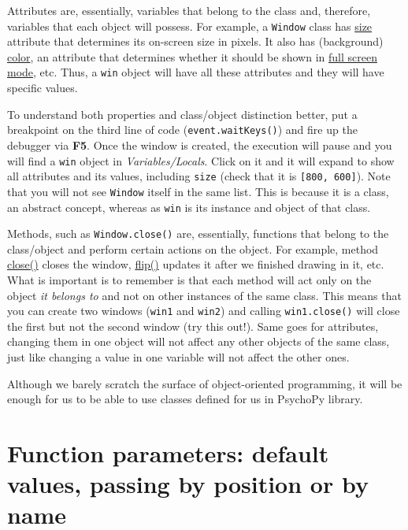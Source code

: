 \documentclass[
]{book}
\begin{document}
Attributes are, essentially, variables that belong to the class and, therefore, variables that each object will possess. For example, a \texttt{Window} class has \href{https://psychopy.org/api/visual/window.html\#psychopy.visual.Window.size}{size} attribute that determines its on-screen size in pixels. It also has (background) \href{https://psychopy.org/api/visual/window.html\#psychopy.visual.Window.color}{color}, an attribute that determines whether it should be shown in \href{https://psychopy.org/api/visual/window.html\#psychopy.visual.Window.fullscr}{full screen mode}, etc. Thus, a \texttt{win} object will have all these attributes and they will have specific values.

To understand both properties and class/object distinction better, put a breakpoint on the third line of code (\texttt{event.waitKeys()}) and fire up the debugger via \textbf{F5}. Once the window is created, the execution will pause and you will find a \texttt{win} object in \emph{Variables/Locals}. Click on it and it will expand to show all attributes and its values, including \texttt{size} (check that it is \texttt{{[}800,\ 600{]}}). Note that you will not see \texttt{Window} itself in the same list. This is because it is a class, an abstract concept, whereas as \texttt{win} is its instance and object of that class.

Methods, such as \texttt{Window.close()} are, essentially, functions that belong to the class/object and perform certain actions on the object. For example, method \href{https://psychopy.org/api/visual/window.html\#psychopy.visual.Window.close}{close()} closes the window, \href{https://psychopy.org/api/visual/window.html\#psychopy.visual.Window.flip}{flip()} updates it after we finished drawing in it, etc. What is important is to remember is that each method will act only on the object \emph{it belongs to} and not on other instances of the same class. This means that you can create two windows (\texttt{win1} and \texttt{win2}) and calling \texttt{win1.close()} will close the first but not the second window (try this out!). Same goes for attributes, changing them in one object will not affect any other objects of the same class, just like changing a value in one variable will not affect the other ones.

Although we barely scratch the surface of object-oriented programming, it will be enough for us to be able to use classes defined for us in PsychoPy library.

\hypertarget{arguments-by-position-or-name}{%
\section{Function parameters: default values, passing by position or by name}\label{arguments-by-position-or-name}}
\end{document}
